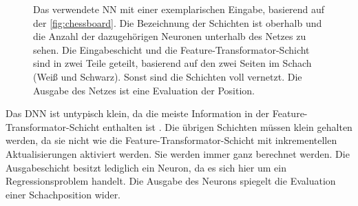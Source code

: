 \begin{figure}
{
  }%
  \caption{Das verwendete \ac{NN} mit einer exemplarischen Eingabe, basierend auf der \autoref{fig:chessboard}. Die Bezeichnung der Schichten ist oberhalb und die Anzahl der dazugehörigen Neuronen unterhalb des Netzes zu sehen. Die Eingabeschicht und die Feature-Transformator-Schicht sind in zwei Teile geteilt, basierend auf den zwei Seiten im Schach (Weiß und Schwarz). Sonst sind die Schichten voll vernetzt. Die Ausgabe des Netzes ist eine Evaluation der Position.}
  \label{fig:own-nn}
\end{figure}

Das \acl{DNN} ist untypisch klein, da die meiste Information in der Feature-Transformator-Schicht enthalten ist \cite{StockfishNNUE}. Die übrigen Schichten müssen klein gehalten werden, da sie nicht wie die Feature-Transformator-Schicht mit inkrementellen Aktualisierungen aktiviert werden. Sie werden immer ganz berechnet werden. Die Ausgabeschicht besitzt lediglich ein Neuron, da es sich hier um ein Regressionsproblem handelt. Die Ausgabe des Neurons spiegelt die Evaluation einer Schachposition wider.

